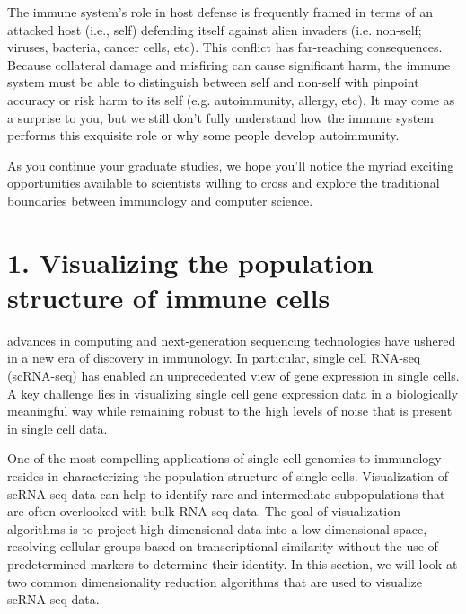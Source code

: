 \documentclass{tufte-book}\usepackage[]{graphicx}\usepackage[]{xcolor}
\begin{document}
The immune system's role in host defense is frequently framed in terms of an attacked host (i.e., self) defending itself against alien invaders (i.e. non-self; viruses, bacteria, cancer cells, etc).  This conflict has far-reaching consequences. Because collateral damage and misfiring can cause significant harm, the immune system must be able to distinguish between self and non-self with pinpoint accuracy or risk harm to its self (e.g. autoimmunity, allergy, etc). It may come as a surprise to you, but we still don't fully understand how the immune system performs this exquisite role or why some people develop autoimmunity.

As you continue your graduate studies, we hope you'll notice the myriad exciting opportunities available to scientists willing to cross and explore the traditional boundaries between immunology and computer science.

\section{\textbf{1. Visualizing the population structure of immune cells}} 

 advances in computing and next-generation sequencing technologies have ushered in a new era of discovery in immunology. In particular, single cell RNA-seq (scRNA-seq)  has enabled an unprecedented view of gene expression in single cells. A key challenge lies in visualizing single cell gene expression data in a biologically meaningful way while remaining robust to the high levels of noise that is present in single cell data. 

One of the most compelling applications of single-cell genomics to immunology resides in characterizing the population structure of single cells. Visualization of scRNA-seq data can help to identify rare and intermediate subpopulations that are often overlooked with bulk RNA-seq data.  The goal of visualization algorithms is to project high-dimensional data into a low-dimensional space, resolving cellular groups based on transcriptional similarity without the use of predetermined markers to determine their identity. In this section, we will look at two common dimensionality reduction algorithms that are used to visualize scRNA-seq data.
\end{document}
